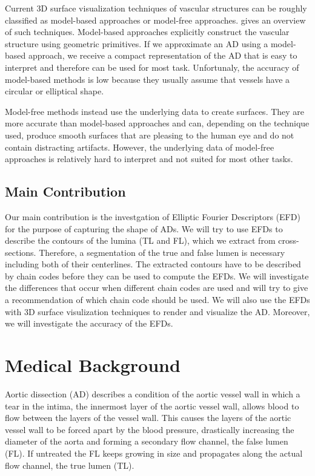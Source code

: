 \documentclass[thesis.tex]{subfiles}
\begin{document}
Current 3D surface visualization techniques of vascular structures can be roughly classified as model-based approaches or model-free approaches. \cite{preim20083d} gives an overview of such techniques. Model-based approaches explicitly construct the vascular structure using geometric primitives. If we approximate an AD using a model-based approach, we receive a compact representation of the AD that is easy to interpret and therefore can be used for most task. Unfortunaly, the accuracy of model-based methods is low because they usually assume that vessels have a circular or elliptical shape.  

Model-free methods instead use the underlying data to create surfaces. They are more accurate than model-based approaches and can, depending on the technique used, produce smooth surfaces that are pleasing to the human eye and do not contain distracting artifacts. However, the underlying data of model-free approaches is relatively hard to interpret and not suited for most other tasks. 

\section{Main Contribution}

Our main contribution is the investgation of Elliptic Fourier Descriptors (EFD) for the purpose of capturing the shape of ADs. We will try to use EFDs to describe the contours of the lumina (TL and FL), which we extract from cross-sections. Therefore, a segmentation of the true and false lumen is necessary including both of their centerlines. The extracted contours have to be described by chain codes before they can be used to compute the EFDs. We will investigate the differences that occur when different chain codes are used and will try to give a recommendation of which chain code should be used. We will also use the EFDs with 3D surface visulization techniques to render and visualize the AD. Moreover, we will investigate the accuracy of the EFDs.

\chapter{Medical Background}

Aortic dissection (AD) describes a condition of the aortic vessel wall in which a tear in the intima, the innermost layer of the aortic vessel wall, allows blood to flow between the layers of the vessel wall. This causes the layers of the aortic vessel wall to be forced apart by the blood pressure, drastically increasing the diameter of the aorta and forming a secondary flow channel, the false lumen (FL). If untreated the FL keeps growing in size and propagates along the actual flow channel, the true lumen (TL).
\end{document}
